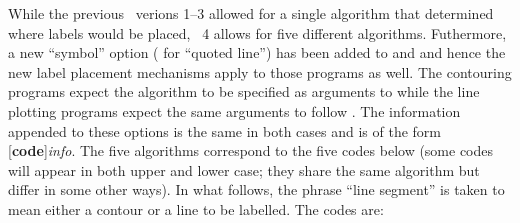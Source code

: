 While the previous \GMT\ verions 1--3 allowed for a single algorithm that
determined where labels would be placed, \GMT\ 4 allows for five different
algorithms.  Futhermore, a new ``symbol'' option ( for ``quoted line'')
has been added to  and  and hence the new label
placement mechanisms apply to those programs as well.  The contouring programs
expect the algorithm to be specified as arguments to  while the line plotting
programs expect the same arguments to follow .  The information appended
to these options is the same in both cases and is of the form [{\bf code}]{\it info}.
The five algorithms correspond to the five codes below (some codes will appear in both
upper and lower case; they share the same algorithm but differ in some other ways).
In what follows, the phrase ``line segment'' is taken to mean either a contour or a line
to be labelled.  The codes are:
